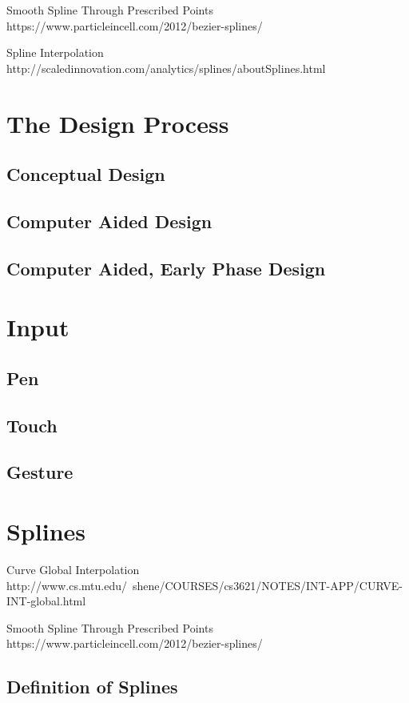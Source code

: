 \documentclass{article}
\begin{document}
Smooth Spline Through Prescribed Points https://www.particleincell.com/2012/bezier-splines/

Spline Interpolation http://scaledinnovation.com/analytics/splines/aboutSplines.html

\section{The Design Process}

\subsection{Conceptual Design}

\subsection{Computer Aided Design}

\subsection{Computer Aided, Early Phase Design}

\section{Input}

\subsection{Pen}

\subsection{Touch}

\subsection{Gesture}

\section{Splines}

Curve Global Interpolation http://www.cs.mtu.edu/~shene/COURSES/cs3621/NOTES/INT-APP/CURVE-INT-global.html

Smooth Spline Through Prescribed Points https://www.particleincell.com/2012/bezier-splines/

\subsection{Definition of Splines}
\end{document}
